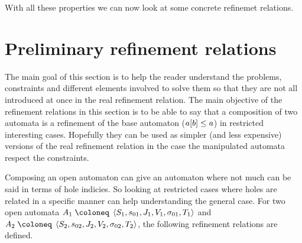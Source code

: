 \documentclass{article}
\begin{document}

With all these properties we can now look at some concrete refinemet relations.


\section{Preliminary refinement relations}\label{sec:prelref}
The main goal of this section is to help the reader understand the problems, constraints and different elements involved to solve them so that they are not all introduced at once in the real refinement relation.
The main objective of the refinement relations in this section is to be able to say that a composition of two automata is a refinement of the base automaton (\(a{\left[b\right]} \leq a\)) in restricted interesting cases.
Hopefully they can be used as simpler (and less expensive) versions of the real refinement relation in the case the manipulated automata respect the constraints.

Composing an open automaton can give an automaton where not much can be said in terms of hole indicies.
So looking at restricted cases where holes are related in a specific manner can help understanding the general case.
For two open automata \(A_1 \defobject \OA{S_1}{s_{01}}{J_1}{V_1}{\sigma_{01}}{T_1}\) and \(A_2 \defobject \OA{S_2}{s_{02}}{J_2}{V_2}{\sigma_{02}}{T_2}\), the following refinement relations are defined.
\end{document}
